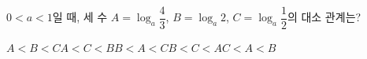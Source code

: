 $0<a<1$일 때, 세 수 $A=\log_a \dfrac{4}{3}$, $B=\log_a 2$, $C=\log_a \dfrac{1}{2}$의 대소 관계는?
\begin{choicesii}{$A<B<C$}{$A<C<B$}{$B<A<C$}{$B<C<A$}{$C<A<B$}\end{choicesii}
